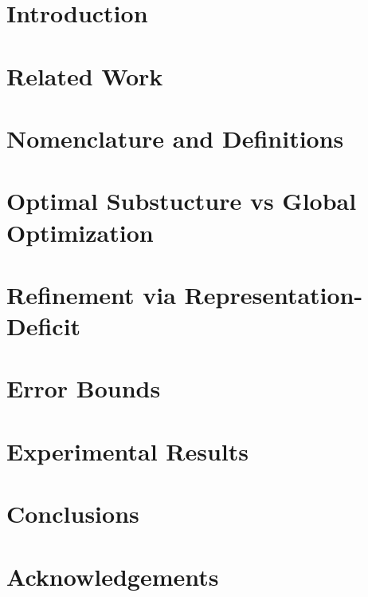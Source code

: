 \documentclass[11pt]{article}
\begin{document}
\section{Introduction}

\section{Related Work}

\section{Nomenclature and Definitions}

\section{Optimal Substucture vs Global Optimization}

\section{Refinement via Representation-Deficit}

\section{Error Bounds}
\section{Experimental Results}
\section{Conclusions}
\section{Acknowledgements}
\end{document}

